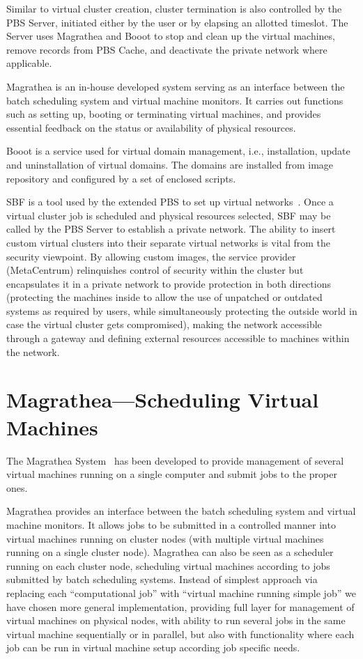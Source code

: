 \documentclass[a4paper]{article}
\begin{document}
Similar to virtual cluster creation, cluster termination is also controlled
by the PBS Server, initiated either by the user or by elapsing an allotted timeslot. The Server uses Magrathea and Booot to stop and clean up the virtual machines, remove records from PBS Cache, and deactivate the private network where applicable.

Magrathea \cite{sc07} is an in-house developed system serving as an interface between the batch scheduling system and virtual machine monitors. It carries out
functions such as setting up, booting or terminating virtual machines, and provides essential feedback on the status or availability of physical
resources.

Booot is a service used for virtual domain management, i.e., installation, update and uninstallation of virtual domains. The domains are installed from image repository and configured by a set of enclosed scripts.

SBF is a tool used by the extended PBS to set up virtual networks~\cite{sbf}. Once a virtual cluster job is scheduled and physical resources selected, SBF may be called by the PBS Server to establish a private network. The ability to insert custom virtual clusters into their separate virtual networks is vital from the security viewpoint. By allowing custom images, the service
provider (MetaCentrum) relinquishes control of security within the cluster but encapsulates it in a private network to provide protection in both directions (protecting the
machines inside to allow the use of unpatched or outdated systems as required by users, while simultaneously protecting the outside world in case the virtual
cluster gets compromised), making the network accessible through a gateway and defining external resources accessible to machines within the network.

\section{Magrathea---Scheduling Virtual Machines}
\label{magrathea}

The Magrathea System~\cite{sc07} has been developed to provide management of several virtual
machines running on a single computer and submit jobs to the proper ones.

Magrathea provides an interface between the batch scheduling system and virtual
machine monitors. It allows jobs to be submitted in a controlled manner into virtual
machines running on cluster nodes (with multiple virtual machines running on a single
cluster node). Magrathea can also be seen as a scheduler running on each cluster node,
scheduling virtual machines according to jobs submitted by batch scheduling systems.
Instead of simplest approach via replacing each ``computational job'' with
``virtual machine running simple job'' we have chosen more general implementation, 
providing full layer for management of virtual machines on physical nodes, 
with ability to run several jobs in the same virtual machine sequentially or in parallel, 
but also with functionality where each job can be run in
virtual machine setup according job specific needs.
\end{document}
